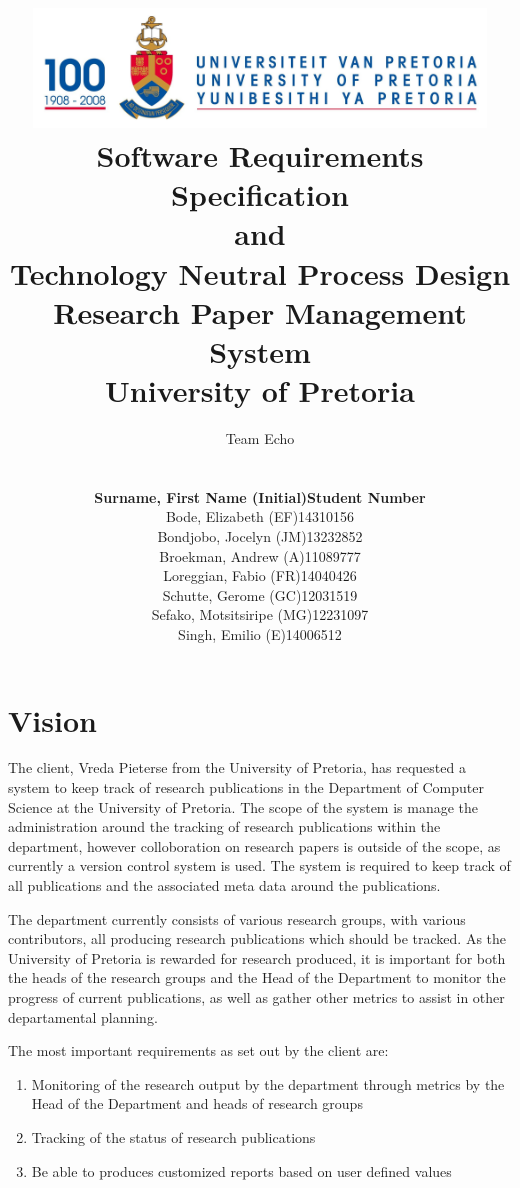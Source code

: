 \documentclass[a4paper,10pt]{article}
\title{\includegraphics[width=12cm]{Eeufeeslogo.jpg} \\
       Software Requirements Specification \\ 
       and \\
       Technology Neutral Process Design \\
       Research Paper Management System \\
       \vspace{0.5cm}
       University of Pretoria \\
       \vspace{1.0cm}
       }
\date{}
\author{Team Echo\\
	\vspace{0.5cm} \\
	\begin{tabu} to \textwidth { X[l] X[l]}
		\hline
		\textbf{Surname, First Name (Initial)}	& \textbf{Student Number}	\\ \hline \hline
		Bode, Elizabeth (EF)			& 14310156		\\ \hline
		Bondjobo, Jocelyn (JM)		& 13232852		\\ \hline
		Broekman, Andrew (A)		& 11089777		\\ \hline
		Loreggian, Fabio (FR)			& 14040426		\\ \hline
		Schutte, Gerome (GC)		& 12031519		\\ \hline
		Sefako, Motsitsiripe (MG)		& 12231097		\\ \hline
		Singh, Emilio (E)			& 14006512		\\ \hline
		\hline
	\end{tabu}}
\begin{document}
\maketitle
\thispagestyle{empty}
\clearpage

\newpage
{}
\thispagestyle{empty}
\tableofcontents
\clearpage

\newpage
{}

\section{Vision}
The client, Vreda Pieterse from the University of Pretoria, has requested a system to keep track of research publications in the Department of Computer Science at the University of Pretoria. The scope of the system is manage the administration around the tracking of research publications within the department, however colloboration on research papers is outside of the scope, as currently a version control system is used. The system is required to keep track of all publications and the associated meta data around the publications.

The department currently consists of various research groups, with various contributors, all producing research publications which should be tracked. As the University of Pretoria is rewarded for research produced, it is important for both the heads of the research groups and the Head of the Department to monitor the progress of current publications, as well as gather other metrics to assist in other departamental planning.

The most important requirements as set out by the client are:
\begin{enumerate}
\item Monitoring of the research output by the department through metrics by the Head of the Department and heads of research groups
\item Tracking of the status of research publications
\item Be able to produces customized reports based on user defined values
\end{enumerate}
\end{document}
